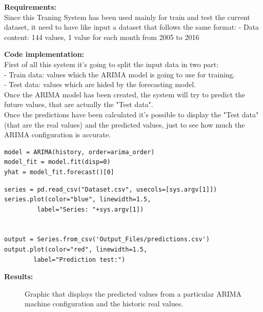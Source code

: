 \textbf{Requirements:}\\
Since this Traning System has been used mainly for train and test the current dataset, it need to have like input a dataset that follows the same format:
- Data content: 144 values, 1 value for each month from 2005 to 2016

\textbf{Code implementation:}\\
First of all this system it's going to split the input data in two part:\\
- Train data: values which the ARIMA model is going to use for training. \\
- Test data: values which are hided by the forecasting model. \\
Once the ARIMA model has been created, the system will try to predict the future values, that are actually the "Test data".\\
Once the predictions have been calculated it's possible to display the "Test data" (that are the real values) and the predicted values, just to see how much the ARIMA configuration is accurate.
\begin{lstlisting}
model = ARIMA(history, order=arima_order)
model_fit = model.fit(disp=0)
yhat = model_fit.forecast()[0]
\end{lstlisting}
\begin{lstlisting}
series = pd.read_csv("Dataset.csv", usecols=[sys.argv[1]])
series.plot(color="blue", linewidth=1.5,
		 label="Series: "+sys.argv[1])


output = Series.from_csv('Output_Files/predictions.csv')
output.plot(color="red", linewidth=1.5,
		label="Prediction test:")
\end{lstlisting}
\textbf{Results:}\\

\begin{figure}[H]
	\centering
    \caption{Graphic that displays the predicted values from a particular ARIMA machine configuration and the historic real values.}
\end{figure}



